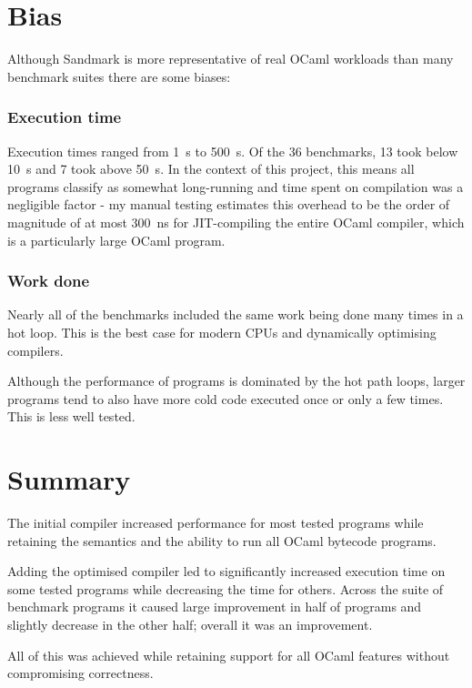 \section{Bias}

Although Sandmark is more representative of real OCaml workloads than many benchmark suites there
are some biases:

\subsubsection{Execution time} \label{bias-exec-time}

Execution times ranged from \SI{1}{\second} to \SI{500}{\second}. Of the 36 benchmarks, 13 took
below \SI{10}{\second} and 7 took above \SI{50}{\second}.  In the context of this project, this
means all programs classify as somewhat long-running and time spent on compilation was a negligible
factor - my manual testing estimates this overhead to be the order of magnitude of at most
\SI{300}{\nano\second} for JIT-compiling the entire OCaml compiler, which is a particularly large
OCaml program.

\subsubsection{Work done}

Nearly all of the benchmarks included the same work being done many times in a hot loop. This is
the best case for modern CPUs and dynamically optimising compilers.

Although the performance of programs is dominated by the hot path loops, larger programs tend to
also have more cold code executed once or only a few times. This is less well tested.

\section{Summary}

The initial compiler increased performance for most tested programs while retaining the semantics
and the ability to run all OCaml bytecode programs.

Adding the optimised compiler led to significantly increased execution time on some tested programs
while decreasing the time for others. Across the suite of benchmark programs it caused large
improvement in half of programs and slightly decrease in the other half; overall it was an
improvement.

All of this was achieved while retaining support for all OCaml features without compromising
correctness.